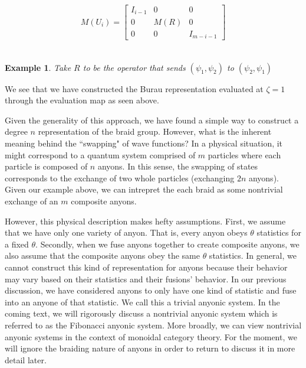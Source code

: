 \documentclass[10pt]{ucthesis}
\newtheorem{example}[definition]{Example}
\begin{document}
\begin{equation}
	\begin{aligned}
		M(U_i) = \begin{bmatrix}
						I_{i-1} & 0 & 0 \\
						0 & M(R) & 0 \\
						0 & 0 & I_{m - i - 1}
					\end{bmatrix}
	\end{aligned}
\end{equation}\\


\begin{example}Take $R$ to be the operator that sends $(\psi_1,\psi_2)$ to $(\psi_2,\psi_1)$ 
\end{example}
We see that we have constructed the Burau representation evaluated at $\zeta=1$ through the evaluation map as seen above.

Given the generality of this approach, we have found a simple way to construct a degree $n$ representation of the braid group. However, what is the inherent meaning behind the ``swapping" of wave functions? In a physical situation, it might correspond to a quantum system comprised of $m$ particles where each particle is composed of $n$ anyons. In this sense, the swapping of states corresponds to the exchange of two whole particles (exchanging $2n$ anyons). Given our example above, we can intrepret the each braid as some nontrivial exchange of an $m$ composite anyons. 

However, this physical description makes hefty assumptions. First, we assume that we have only one variety of anyon. That is, every anyon obeys $\theta$ statistics for a fixed $\theta$. Secondly, when we fuse anyons together to create composite anyons, we also assume that the composite anyons obey the same $\theta$ statistics. In general, we cannot construct this kind of representation for anyons because their behavior may vary based on their statistics and their fusions' behavior. In our previous discussion, we have considered anyons to only have one kind of statistic and fuse into an anyone of that statistic. We call this a trivial anyonic system. In the coming text, we will rigorously discuss a nontrivial anyonic system which is referred to as the Fibonacci anyonic system. More broadly, we can view nontrivial anyonic systems in the context of monoidal category theory. For the moment, we will ignore the braiding nature of anyons in order to return to discuss it in more detail later.
\end{document}
